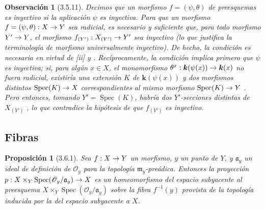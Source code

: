 \documentclass[oneside]{amsart}
\theoremstyle{ega-env-style}
\theoremstyle{ega-thm-env-style}
\newtheorem*{proposition}{Proposición}
\theoremstyle{ega-defn-env-style}
\newtheorem*{remark}{Observación}
\def\mathcal{\mathscr}
\renewcommand{\to}{\mathchoice{\longrightarrow}{\rightarrow}{\rightarrow}{\rightarrow}}
\let\EGAOriginalLabel\label
\renewcommand{\label}[1]{\phantomsection\EGAOriginalLabel{#1}}
\begin{document}
\begin{remark}[3.5.11]
\label{I.3.5.11}
Decimos que un morfismo $f=(\psi,\theta)$ de preesquemas es \emph{inyectivo} si la aplicación $\psi$ es inyectiva.
Para que un morfismo $f=(\psi,\theta):X\to Y$ sea radicial, es necesario y suficiente que, para todo morfismo $Y'\to Y$, el morfismo $f_{(Y')}:X_{(Y')}\to Y'$ sea inyectivo (lo que justifica la terminología de morfismo \emph{universalmente inyectivo}).
De hecho, la condición es necesaria en virtud de [ii] y .
Recíprocamente, la condición implica primero que $\psi$ es inyectiva; si, para algún $x\in X$, el monomorfismo $\theta^x:\boldsymbol{k}(\psi(x))\to\boldsymbol{k}(x)$ no fuera radicial, existiría una extensión $K$ de $\boldsymbol{k}(\psi(x))$ y dos morfismos distintos $\operatorname{Spec}(K)\to X$ correspondientes al mismo morfismo $\operatorname{Spec}(K)\to Y$ .
Pero entonces, tomando $Y'=\operatorname{Spec}(K)$, habría dos $Y'$-secciones distintas de $X_{(Y')}$ , lo que contradice la hipótesis de que $f_{(Y')}$ es inyectivo.
\end{remark}

\subsection{Fibras}
\label{subsection:I.3.6}

\begin{proposition}[3.6.1]
\label{I.3.6.1}
Sea $f:X\to Y$ un morfismo, $y$ un punto de $Y$, y $\mathfrak{a}_y$ un ideal de definición de $\mathcal{O}_y$ para la topología $\mathfrak{m}_y$-preádica.
Entonces la proyección $p:X\times_Y\operatorname{Spec}(\mathcal{O}_y/\mathfrak{a}_y)\to X$ es un homeomorfismo del espacio subyacente al preesquema $X\times_Y\operatorname{Spec}(\mathcal{O}_y/\mathfrak{a}_y)$ sobre la fibra $f^{-1}(y)$ provista de la topología inducida por la del espacio subyacente a $X$.
\end{proposition}
\end{document}
